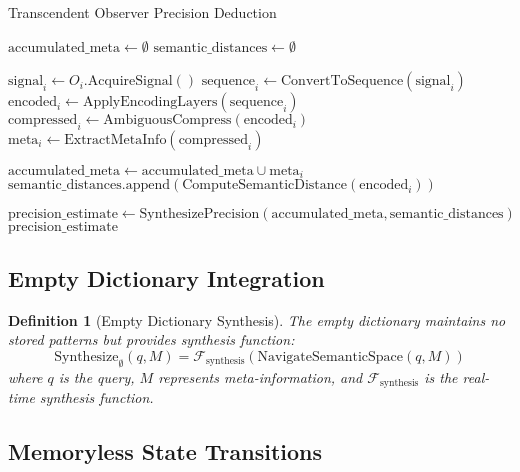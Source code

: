 \documentclass[12pt,a4paper]{article}
\newtheorem{definition}{Definition}
\begin{document}
\begin{algorithm}[H]
\caption{Transcendent Observer Precision Deduction}
\label{alg:precision_deduction}
\begin{algorithmic}[1]
    \State $\text{accumulated\_meta} \gets \emptyset$
    \State $\text{semantic\_distances} \gets \emptyset$

        \State $\text{signal}_i \gets O_i.\text{AcquireSignal}()$
        \State $\text{sequence}_i \gets \text{ConvertToSequence}(\text{signal}_i)$
        \State $\text{encoded}_i \gets \text{ApplyEncodingLayers}(\text{sequence}_i)$
        \State $\text{compressed}_i \gets \text{AmbiguousCompress}(\text{encoded}_i)$
        \State $\text{meta}_i \gets \text{ExtractMetaInfo}(\text{compressed}_i)$

        \State $\text{accumulated\_meta} \gets \text{accumulated\_meta} \cup \text{meta}_i$
        \State $\text{semantic\_distances}.\text{append}(\text{ComputeSemanticDistance}(\text{encoded}_i))$
    \EndFor

    \State $\text{precision\_estimate} \gets \text{SynthesizePrecision}(\text{accumulated\_meta}, \text{semantic\_distances})$
    \State \Return $\text{precision\_estimate}$
\EndProcedure
\end{algorithmic}
\end{algorithm}

\subsection{Empty Dictionary Integration}

\begin{definition}[Empty Dictionary Synthesis]
The empty dictionary maintains no stored patterns but provides synthesis function:
\begin{equation}
\text{Synthesize}_{\emptyset}(q, M) = \mathcal{F}_{\text{synthesis}}(\text{NavigateSemanticSpace}(q, M))
\end{equation}
where $q$ is the query, $M$ represents meta-information, and $\mathcal{F}_{\text{synthesis}}$ is the real-time synthesis function.
\end{definition}

\subsection{Memoryless State Transitions}
\end{document}
